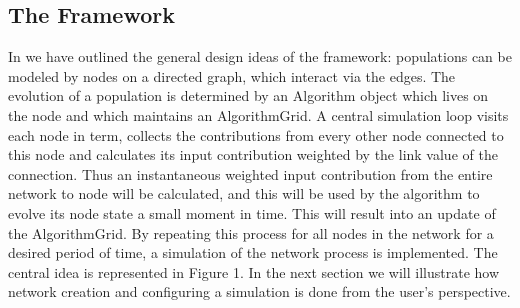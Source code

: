 \documentclass[12pt]{article}
\begin{document}
\subsection{The Framework}
In \citep{dekamps2008} we have outlined the general design ideas of the framework: populations can be modeled by nodes on a directed graph, 
which interact via the edges. The evolution of a population is determined by an Algorithm object which lives on the node and which maintains an 
AlgorithmGrid. A central simulation loop visits each node in term, collects the contributions from every other node connected to this node and calculates 
its input contribution weighted by the link value of the connection. Thus an instantaneous weighted input contribution from the entire network to node will 
be calculated, and this will be used by the algorithm to evolve its node state a small moment in time. This will result into an update of the AlgorithmGrid. 
By repeating this process for all nodes in the network for a desired period of time, a simulation of the network process is implemented. 
The central idea is represented in Figure 1. In the next section we will illustrate how network creation and configuring a simulation is done 
from the user's perspective.
\end{document}
